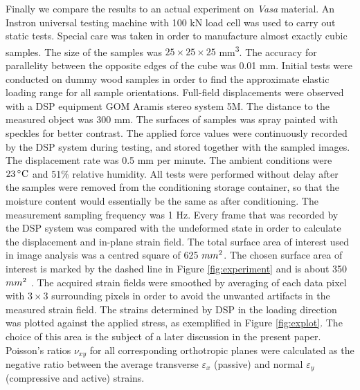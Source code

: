 \documentclass[review]{elsarticle}
\begin{document}
Finally we compare the results to an actual experiment on \textit{Vasa}
material.
An Instron universal testing machine with 100 kN load cell was used to carry out static tests. 
Special care was taken in order to manufacture almost exactly cubic samples. 
The size of the samples was  $25\times25\times25$ mm\textsuperscript{3}.  The
accuracy for parallelity between the opposite edges of the cube was 0.01 mm. 
Initial tests were conducted on dummy wood samples in order to find the approximate elastic loading range for all sample orientations.
Full-field displacements were observed with a DSP equipment GOM Aramis stereo system 5M.
The distance to the measured object was 300 mm. The surfaces of samples was spray
painted with speckles for better contrast. The applied force values were continuously recorded by the DSP system during testing, and stored together with the sampled images. The displacement rate was 0.5 mm per minute. 
The ambient conditions were $23\,^{\circ}{\rm C}$ and 51\% relative humidity.
All tests were performed without delay after the samples were removed from the conditioning storage container, so that the moisture content would essentially be the same as after conditioning. The measurement sampling frequency was 1 Hz. 
Every frame that was recorded by the DSP system was compared with the undeformed state in order to calculate the displacement and in-plane strain field. 
The total surface area of interest used in image analysis was a centred square
of 625 $mm\textsuperscript{2}$.
The chosen surface area of interest is marked by the dashed line in Figure
\ref{fig:experiment} and is about 350 $mm\textsuperscript{2}$ . The acquired
strain fields were smoothed by averaging of each data pixel with $3\times3$ surrounding pixels in order to avoid the
unwanted artifacts in the measured strain field.
The strains determined by DSP in the loading direction was plotted against the
applied stress, as exemplified in Figure \ref{fig:explot}. The choice of this
area is the subject of a later discussion in the present paper.
Poisson's ratios $\nu_{xy}$ for all corresponding orthotropic planes were
calculated as the negative ratio between the average transverse
$\varepsilon_{x}$ (passive) and normal $\varepsilon_{y}$ (compressive and
active) strains.
\end{document}
